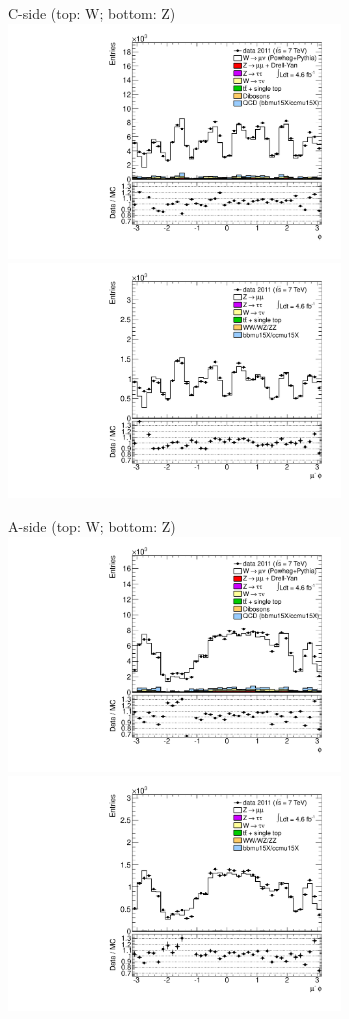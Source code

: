 {

\colb[T]

C-side (top: W; bottom: Z)
\centering
\includegraphics[width=0.66\textwidth]{dates/20130306/figures/etaphi/W_1_C_stack_l_phi_NEG} \\
\includegraphics[width=0.66\textwidth]{dates/20130306/figures/etaphi/Z_1_C_stack_lN_phi_ALL.pdf}

A-side (top: W; bottom: Z)
\centering
\includegraphics[width=0.66\textwidth]{dates/20130306/figures/etaphi/W_1_A_stack_l_phi_NEG} \\
\includegraphics[width=0.66\textwidth]{dates/20130306/figures/etaphi/Z_1_A_stack_lN_phi_ALL.pdf} 

\cole
}


